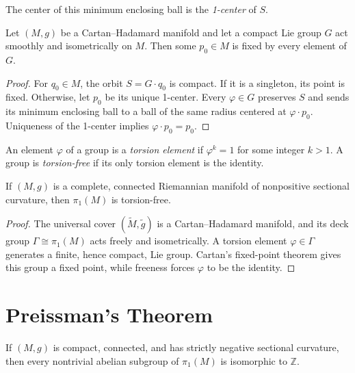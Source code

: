 The center of this minimum enclosing ball is the \emph{1-center} of $S$.

\begin{theorem}
\label{thm:cartans-fixed-point}

Let $(M,g)$ be a Cartan--Hadamard manifold and let a compact Lie group $G$
act smoothly and isometrically on $M$.  Then some $p_0\in M$ is fixed by
every element of $G$.
\begin{proof}
\sketch For $q_0\in M$, the orbit $S=G\cdot q_0$ is compact.  If it is a
singleton, its point is fixed.  Otherwise, let $p_0$ be its unique 1-center.
Every $\varphi\in G$ preserves $S$ and sends its minimum enclosing ball to a
ball of the same radius centered at $\varphi\cdot p_0$.  Uniqueness of the
1-center implies $\varphi\cdot p_0=p_0$.
\end{proof}
\end{theorem}

An element $\varphi$ of a group is a \emph{torsion element} if
$\varphi^k=1$ for some integer $k>1$.  A group is \emph{torsion-free} if its
only torsion element is the identity.

\begin{corollary}
\label{cor:cartans-torsion-theorem}

If $(M,g)$ is a complete, connected Riemannian manifold of nonpositive
sectional curvature, then $\pi_1(M)$ is torsion-free.
\begin{proof}
\sketch The universal cover $(\widetilde M,\widetilde g)$ is a
Cartan--Hadamard manifold, and its deck group
$\Gamma\cong\pi_1(M)$ acts freely and isometrically.  A torsion element
$\varphi\in\Gamma$ generates a finite, hence compact, Lie group.  Cartan's
fixed-point theorem gives this group a fixed point, while freeness forces
$\varphi$ to be the identity.
\end{proof}
\end{corollary}
\section{Preissman's Theorem}

\begin{theorem}[Preissman]
\label{thm:preissman-theorem}
If $(M,g)$ is compact, connected, and has strictly negative sectional
curvature, then every nontrivial abelian subgroup of $\pi_1(M)$ is isomorphic
to $\mathbb Z$.
\end{theorem}

